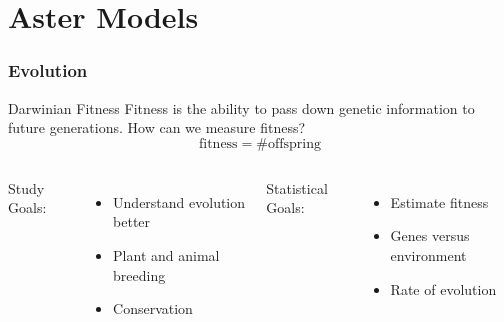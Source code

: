 \documentclass[table]{beamer}
\begin{document}
\section{Aster Models}

\begin{frame}
  \frametitle{Evolution}
\begin{block}{Darwinian Fitness}
  Fitness is the ability to pass down genetic information to future
  generations. How can we measure fitness? 
  $$ \text{fitness} = \# \text{offspring}$$
\end{block}
\begin{columns}[t]
Study Goals:
  \begin{itemize}
    \item Understand evolution better
    \item Plant and animal breeding
    \item Conservation
  \end{itemize}

Statistical Goals:
  \begin{itemize}
    \item Estimate fitness
    \item Genes versus environment
    \item Rate of evolution
  \end{itemize}
\end{columns}
\end{frame}
\end{document}
